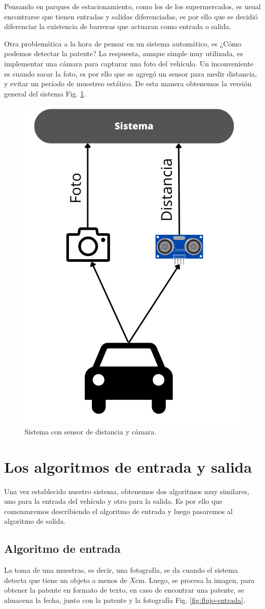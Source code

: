 Pensando en parques de estacionamiento, como los de los supermercados, es usual encontrarse que tienen entradas y salidas diferenciadas, es por ello que se decidió diferenciar la existencia de barreras que actuaran como entrada o salida.

Otra problemática a la hora de pensar en un sistema automático, es ¿Cómo podemos detectar la patente? La respuesta, aunque simple muy utilizada, es implementar una cámara para capturar una foto del vehículo. Un inconveniente es cuando sacar la foto, es por ello que se agregó un sensor para medir distancia, y evitar un período de muestreo estático. De esta manera obtenemos la versión general del sistema Fig. \ref{fig:sistema-completa}.

\begin{figure}
    \centering
    \includegraphics[width=.3\textwidth]{imgs/sistema-con-sensor.png}
    \caption{Sistema con sensor de distancia y cámara.}
    \label{fig:sistema-completa}
\end{figure}

\section{Los algoritmos de entrada y salida}

Una vez establecido nuestro sistema, obtenemos dos algoritmos muy similares, uno para la entrada del vehículo y otro para la salida. Es por ello que comenzaremos describiendo el algoritmo de entrada y luego pasaremos al algoritmo de salida.

\subsection{Algoritmo de entrada}

La toma de una muestras, es decir, una fotografía, se da cuando el sistema detecta que tiene un objeto a menos de $X$cm. Luego, se procesa la imagen, para obtener la patente en formato de texto, en caso de encontrar una patente, se almacena la fecha, junto con la patente y la fotografía Fig. \ref{fig:flujo-entrada}.

